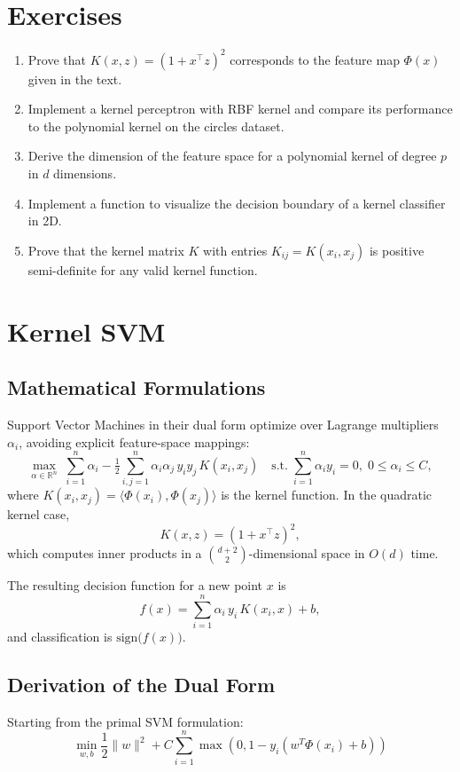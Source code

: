 \documentclass[11pt]{article}
\begin{document}
\section{Exercises}
\begin{enumerate}
  \item Prove that $K(x,z) = (1 + x^\top z)^2$ corresponds to the feature map $\Phi(x)$ given in the text.
  \item Implement a kernel perceptron with RBF kernel and compare its performance to the polynomial kernel on the circles dataset.
  \item Derive the dimension of the feature space for a polynomial kernel of degree $p$ in $d$ dimensions.
  \item Implement a function to visualize the decision boundary of a kernel classifier in 2D.
  \item Prove that the kernel matrix $K$ with entries $K_{ij} = K(x_i, x_j)$ is positive semi-definite for any valid kernel function.
\end{enumerate}
\section{Kernel SVM}

\subsection{Mathematical Formulations}
Support Vector Machines in their dual form optimize over Lagrange multipliers $\alpha_i$, avoiding explicit feature-space mappings:
\[
\max_{\alpha\in\mathbb{R}^n}\;\sum_{i=1}^n \alpha_i
-\tfrac{1}{2}\sum_{i,j=1}^n \alpha_i\alpha_j\,y_i y_j\,K(x_i,x_j)
\quad\text{s.t.}\;\sum_{i=1}^n \alpha_i y_i = 0,\;0\le \alpha_i\le C,
\]
where $K(x_i,x_j)=\langle\Phi(x_i),\Phi(x_j)\rangle$ is the kernel function. In the quadratic kernel case,
\[
K(x,z)=(1 + x^\top z)^2,
\]
which computes inner products in a $\binom{d+2}{2}$-dimensional space in $O(d)$ time.

The resulting decision function for a new point $x$ is
\[
f(x)=\sum_{i=1}^n \alpha_i\,y_i\,K(x_i,x) + b,
\]
and classification is $\mathrm{sign}\bigl(f(x)\bigr)$.

\subsection{Derivation of the Dual Form}
Starting from the primal SVM formulation:
\[
\min_{w,b} \frac{1}{2}\|w\|^2 + C\sum_{i=1}^n \max(0, 1 - y_i(w^T\Phi(x_i) + b))
\]
\end{document}
